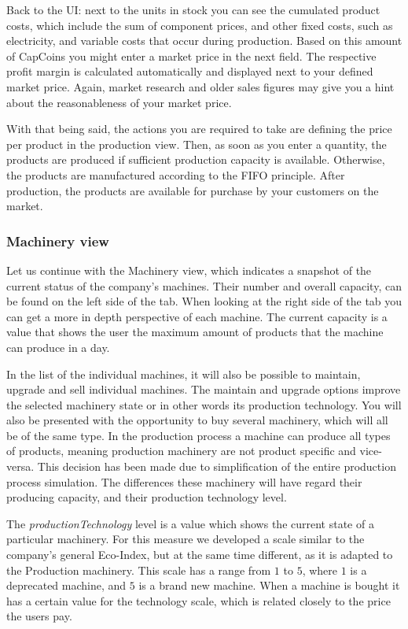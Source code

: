 Back to the UI: next to the units in stock you can see the cumulated product costs, which include the sum of component prices, and other fixed costs, such as electricity, and variable costs that occur during production. Based on this amount of CapCoins you might enter a market price in the next field. The respective profit margin is calculated automatically and displayed next to your defined market price. Again, market research and older sales figures may give you a hint about the reasonableness of your market price. 

With that being said, the actions you are required to take are defining the price per product in the production view. Then, as soon as you enter a quantity, the products are produced if sufficient production capacity is available. Otherwise, the products are manufactured according to the FIFO principle. After production, the products are available for purchase by your customers on the market.

\subsubsection{Machinery view} 
\label{sub:MachineryView}
Let us continue with the Machinery view, which indicates a snapshot of the current status of the company's machines. Their number and overall capacity, can be found on the left side of the tab. When looking at the right side of the tab you can get a more in depth perspective of each machine. The current capacity is a value that shows the user the maximum amount of products that the machine can produce in a day. 

 In the list of the individual machines, it will also be possible to maintain, upgrade and sell individual machines. The maintain and upgrade options improve the selected machinery state or in other words its production technology. 
You will also be presented with the opportunity to buy several machinery, which will all be of the same type. In the production process a machine can produce all types of products, meaning production machinery are not product specific and vice-versa. This decision has been made due to simplification of the entire production process simulation. The differences these machinery will have regard their producing capacity, and their production technology level. 

The \textit{productionTechnology} level is a value which shows the current state of a particular machinery. For this measure we developed a scale similar to the company’s general Eco-Index, but at the same time different, as it is adapted to the Production machinery.  This scale has a range from $1$ to $5$, where $1$ is a deprecated machine, and $5$ is a brand new machine. When a machine is bought it has a certain value for the technology scale, which is related closely to the price the users pay. 

